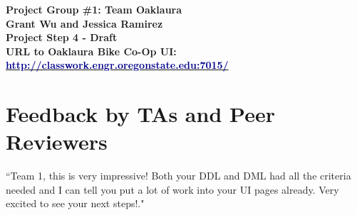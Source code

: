 \documentclass{article}
\begin{document}
\begin{center}
\large\textcolor{primarycolor}{\textbf{Project Group \#1: Team Oaklaura}}\\[0.3cm]
\large\textbf{Grant Wu and Jessica Ramirez}\\[0.3cm]
\huge\textbf{Project Step 4 - Draft}\\[0.5cm]

\large\textbf{URL to Oaklaura Bike Co-Op UI:}\\[0.5cm]
\large\href{http://classwork.engr.oregonstate.edu:7015/}{\textcolor{darkblue}{\textbf{http://classwork.engr.oregonstate.edu:7015/}}}\\[1.25cm]
\end{center}
\section{Feedback by TAs and Peer Reviewers}
\begin{tcolorbox}[colback=secondarycolor, colframe=primarycolor, title=\textbf{Step 3: TA Review - Madelyn Lazar}]
``Team 1, this is very impressive! Both your DDL and DML had all the criteria needed and I can tell you put a lot of work into your UI pages already. Very excited to see your next steps!."
\end{tcolorbox}
\end{document}
